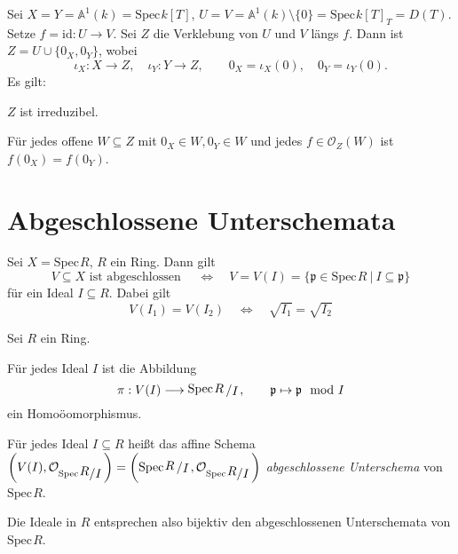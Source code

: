 \documentclass[11pt]{book}
\theoremstyle{nonumberbreak}
\newenvironment{ex}[1][]{\ifthenelse{\equal{#1}{}}{\example}{\example[#1]}\rm}{\endexample}
\newenvironment{bemdefin}[1][]{\ifthenelse{\equal{#1}{}}{\bemdefini}{\bemdefini[#1]}\rm}{\endbemdefini}
\newenvironment{er}[1][]{\ifthenelse{\equal{#1}{}}{\erinner}{\erinner[#1]}\rm}{\enderinner}
\newcommand{\spec}{\mathrm{Spec} \hspace{1pt} }
\newcommand{\p}{\mathfrak{p}}
\newcommand{\K}{k}
\newcommand{\ideal}{\subseteq}
\newcommand{\slant}[2]{{\raisebox{.1em}{$#1$}\left/\raisebox{-.1em}{$#2$}\right.}}
\begin{document}
\begin{spacing}{1.4}
\begin{ex}
Sei $X=Y= \mathbb{A}^1(k)= \spec \K[T]$, $U=V= \mathbb{A}^1(k) \setminus \{ 0 \} = \spec k[T]_T = D(T)$. Setze $f= \textrm{id}: U \longrightarrow V$. Sei $Z$ die Verklebung von $U$ und $V$ längs $f$. Dann ist $Z= U \cup \{0_X, 0_Y\}$, wobei
$$\iota_X: X \longrightarrow Z, \quad \iota_Y: Y \longrightarrow Z, \qquad 0_X= \iota_X(0),\quad 0_Y = \iota_Y(0).$$
Es gilt:
\begin{compactenum}
\item $Z$ ist irreduzibel.
\item Für jedes offene $W\subseteq Z$ mit $0_X \in W, 0_Y \in W$ und jedes $f \in \mathcal{O}_Z(W)$ ist $f(0_X) = f(0_Y)$.
\end{compactenum}
\end{ex}


\renewcommand*\thesection{§ \arabic{section}\quad}
\section{Abgeschlossene Unterschemata} %
\renewcommand*\thesection{\arabic{section}}


\begin{er}  %
Sei $X= \spec R$, $R$ ein Ring. Dann gilt
$$V \subseteq X \textrm{ ist abgeschlossen } \quad \Longleftrightarrow \quad V = V(I) = \{ \p \in \spec R \ \vert \ I \subseteq \p \}$$
für ein Ideal $I \ideal R$. Dabei gilt
$$V(I_1) = V(I_2) \quad \Longleftrightarrow \quad \sqrt{I_1} = \sqrt{I_2}$$
\end{er}


\begin{bemdefin}  %
Sei $R$ ein Ring.
\begin{compactenum}
\item Für jedes Ideal $I$ ist die Abbildung
$$\pi: V(I) \longrightarrow \slant{\spec R}{I}, \qquad \p \mapsto \p \mod I$$
ein Homoöomorphismus.
\item Für jedes Ideal $I \ideal R$ heißt das affine Schema $\left(V(I), \mathcal{O}_{\spec \slant{R}{I}}\right) = \left( \spec \slant{R}{I}, \mathcal{O}_{\spec \slant{R}{I}} \right)$ \textit{abgeschlossene Unterschema} von $\spec R$.
\end{compactenum}
Die Ideale in $R$ entsprechen also bijektiv den abgeschlossenen Unterschemata von $\spec R$.
\end{bemdefin}


\end{spacing}
\end{document}

